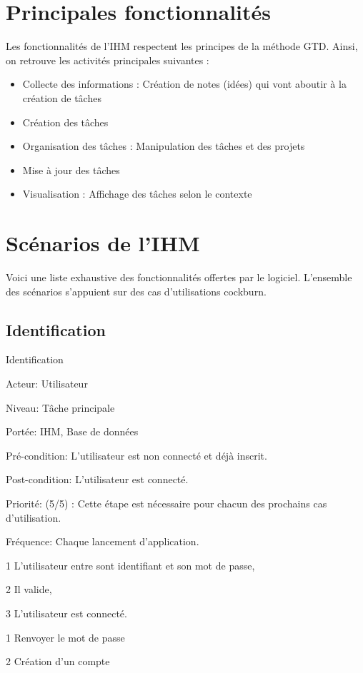 \section{Principales fonctionnalités}
Les fonctionnalités de l'IHM respectent les principes de la méthode GTD. Ainsi, on retrouve les activités principales suivantes : \\
\begin{itemize}
 \item Collecte des informations : Création de notes (idées) qui vont aboutir à la création de tâches
 \item Création des tâches
 \item Organisation des tâches : Manipulation des tâches et des projets
 \item Mise à jour des tâches
 \item Visualisation : Affichage des tâches selon le contexte
\end{itemize}




\section{Scénarios de l'IHM}

Voici une liste exhaustive des fonctionnalités offertes par le logiciel. L'ensemble des scénarios s'appuient sur des cas d'utilisations cockburn.

\subsection{Identification}

\begin{usecase}{Identification}

\begin{information}
\item[Acteur: ] Utilisateur
\item[Niveau:] Tâche principale
\item[Portée:] IHM, Base de données 
\item[Pré-condition:] L'utilisateur est non connecté et déjà inscrit. 
\item[Post-condition:] L'utilisateur est connecté. 
\item[Priorité:] (5/5) : Cette étape est nécessaire pour chacun des prochains cas d'utilisation.
\item[Fréquence:] Chaque lancement d'application.	
\end{information}	

\begin{scenario}
\item[1] L'utilisateur entre sont identifiant et son mot de passe,
\item[2] Il valide,
\item[3] L'utilisateur est connecté. 
\end{scenario}	

\begin{extension}
	\item[1]Renvoyer le mot de passe
	\item[2]Création d'un compte
\end{extension}
\end{usecase}


